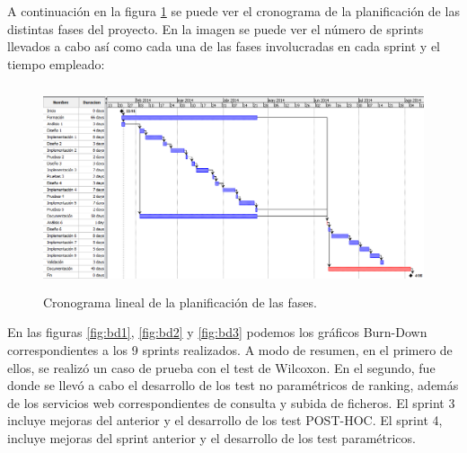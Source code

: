 A continuación en la figura \ref{fig:gantt} se puede ver el cronograma de la planificación de las distintas fases del proyecto. En la imagen se puede ver el número de sprints llevados a cabo así como cada una de las fases involucradas en cada sprint y el tiempo empleado:

\begin{figure}[H]
\centering
\includegraphics[width=13cm,height=6cm]{figuras/gantt.png}
\caption{Cronograma lineal de la planificación de las fases.}
\label{fig:gantt}
\end{figure}

En las figuras \ref{fig:bd1}, \ref{fig:bd2} y \ref{fig:bd3} podemos los gráficos Burn-Down correspondientes a los 9 sprints realizados. A modo de resumen, en el primero de ellos, se realizó un caso de prueba con el test de Wilcoxon. En el segundo, fue donde se llevó a cabo el desarrollo de los test no paramétricos de ranking, además de los servicios web correspondientes de consulta y subida de ficheros. El sprint 3 incluye mejoras del anterior y el desarrollo de los test POST-HOC. El sprint 4, incluye mejoras del sprint anterior y el desarrollo de los test paramétricos.

